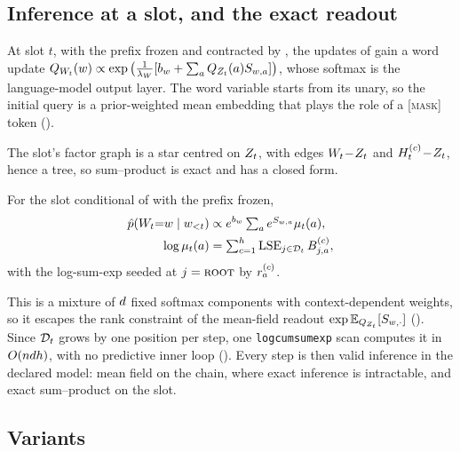 \subsection{Inference at a slot, and the exact readout}
\label{sec:inference}

At slot $t$, with the prefix frozen and contracted by , the updates of
 gain a word update
$Q_{W_{t}}(w) \propto \exp\big(\tfrac{1}{\lambda_W}[b_w + \sum_a Q_{Z_{t}}(a)S_{w,a}]\big)$, whose
softmax is the language-model output layer. The word variable starts from its unary, so the
initial query is a prior-weighted mean embedding that plays the role of a \textsc{[mask]} token
().

The slot's factor graph is a star centred on $Z_{t}$, with edges $W_{t}\!-\!Z_{t}$ and
$H_{t}^{(c)}\!-\!Z_{t}$, hence a tree, so sum--product is exact and has a closed form.

\begin{proposition}
\label{prop:exact-readout}
For the slot conditional of  with the prefix frozen,
\begin{equation}
\label{eq:exact-readout}
\begin{aligned}
  \hat{p}(W_{t}{=}w \mid w_{{<}t}) &\propto e^{b_w}\textstyle\sum_a e^{S_{w,a}}\mu_{t}(a),\\
  \log \mu_{t}(a) &= \textstyle\sum_{c=1}^{h} \operatorname*{LSE}_{j \in \mathcal{D}_{t}} B^{(c)}_{j,a},
\end{aligned}
\end{equation}
with the log-sum-exp seeded at $j=\textup{\textsc{root}}$ by $r^{(c)}_a$.
\end{proposition}

This is a mixture of $d$ fixed softmax components with context-dependent weights, so it
escapes the rank constraint of the mean-field readout $\exp\mathbb{E}_{Q_{Z_{t}}}[S_{w,\cdot}]$
(). Since $\mathcal{D}_{t}$ grows by one position per step, one
\texttt{logcumsumexp} scan computes it in $O(ndh)$, with no predictive inner loop
(). Every step is then valid inference in the declared model: mean
field on the chain, where exact inference is intractable, and exact sum--product on the slot.

\subsection{Variants}
\label{sec:variants}

